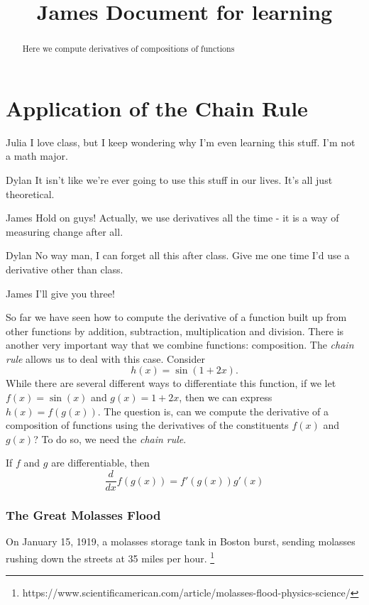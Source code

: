 \documentclass{ximera}
\begin{document}
\title{James Document for learning}
\section{Application of the Chain Rule}

\begin{dialogue}
\item[Julia] I love class, but I keep wondering why I'm even learning this stuff. I'm not a math major.
\item[Dylan] It isn't like we're ever going to use this stuff in our lives. It's all just theoretical.
\item[James] Hold on guys! Actually, we use derivatives all the time - it is a way of measuring change after all.
\item[Dylan] No way man, I can forget all this after class. Give me one time I'd use a derivative other than class.
\item[James] I'll give you three!
\end{dialogue}

\begin{abstract}
Here we compute derivatives of compositions of functions
\end{abstract}


So far we have seen how to compute the derivative of a function built
up from other functions by addition, subtraction, multiplication and
division. There is another very important way that we combine
functions: composition. The \textit{chain rule} allows us to deal with
this case. Consider
\[
h(x) = \sin(1+2x).
\] 
While there are several different ways to differentiate this function,
if we let $f(x) = \sin(x)$ and $g(x) = 1+2x$, then we can express
$h(x) = f(g(x))$. The question is, can we compute the derivative of a
composition of functions using the derivatives of the constituents
$f(x)$ and $g(x)$? To do so, we need the \textit{chain rule}.


\begin{theorem}
If $f$ and $g$ are differentiable, then
\[
\dfrac{d}{dx} f(g(x)) = f'(g(x))g'(x)
\]
\end{theorem}


\subsubsection{The Great Molasses Flood}
On January 15, 1919, a molasses storage tank in Boston burst, sending molasses rushing down the streets at 35 miles per hour. \footnote{https://www.scientificamerican.com/article/molasses-flood-physics-science/}
\end{document}
